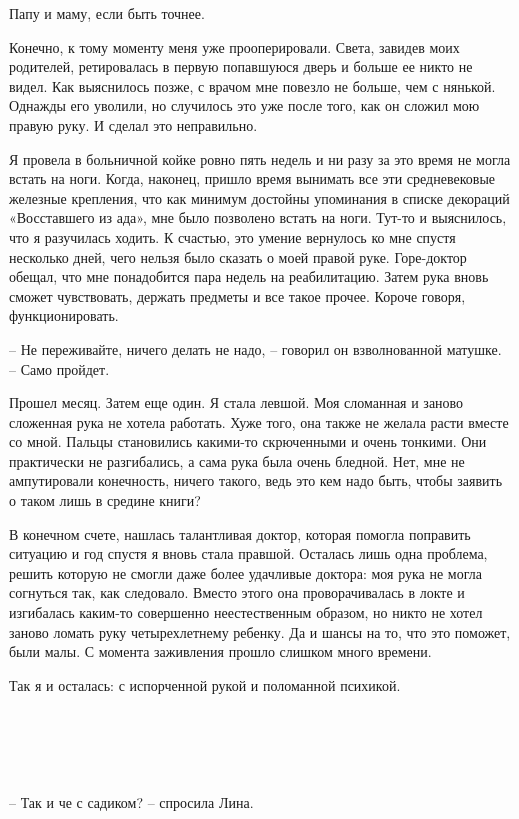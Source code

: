 \documentclass[
]{book}
\begin{document}
Папу и маму, если быть точнее.

Конечно, к тому моменту меня уже прооперировали. Света, завидев моих родителей, ретировалась в первую попавшуюся дверь и больше ее никто не видел. Как выяснилось позже, с врачом мне повезло не больше, чем с нянькой. Однажды его уволили, но случилось это уже после того, как он сложил мою правую руку. И сделал это неправильно.

Я провела в больничной койке ровно пять недель и ни разу за это время не могла встать на ноги. Когда, наконец, пришло время вынимать все эти средневековые железные крепления, что как минимум достойны упоминания в списке декораций «Восставшего из ада», мне было позволено встать на ноги. Тут-то и выяснилось, что я разучилась ходить. К счастью, это умение вернулось ко мне спустя несколько дней, чего нельзя было сказать о моей правой руке. Горе-доктор обещал, что мне понадобится пара недель на реабилитацию. Затем рука вновь сможет чувствовать, держать предметы и все такое прочее. Короче говоря, функционировать.

-- Не переживайте, ничего делать не надо, -- говорил он взволнованной матушке. -- Само пройдет.

Прошел месяц. Затем еще один. Я стала левшой. Моя сломанная и заново сложенная рука не хотела работать. Хуже того, она также не желала расти вместе со мной. Пальцы становились какими-то скрюченными и очень тонкими. Они практически не разгибались, а сама рука была очень бледной. Нет, мне не ампутировали конечность, ничего такого, ведь это кем надо быть, чтобы заявить о таком лишь в средине книги?

В конечном счете, нашлась талантливая доктор, которая помогла поправить ситуацию и год спустя я вновь стала правшой. Осталась лишь одна проблема, решить которую не смогли даже более удачливые доктора: моя рука не могла согнуться так, как следовало. Вместо этого она проворачивалась в локте и изгибалась каким-то совершенно неестественным образом, но никто не хотел заново ломать руку четырехлетнему ребенку. Да и шансы на то, что это поможет, были малы. С момента заживления прошло слишком много времени.

Так я и осталась: с испорченной рукой и поломанной психикой.

\hypertarget{chapter-43}{%
\chapter{~}\label{chapter-43}}

-- Так и че с садиком? -- спросила Лина.
\end{document}
